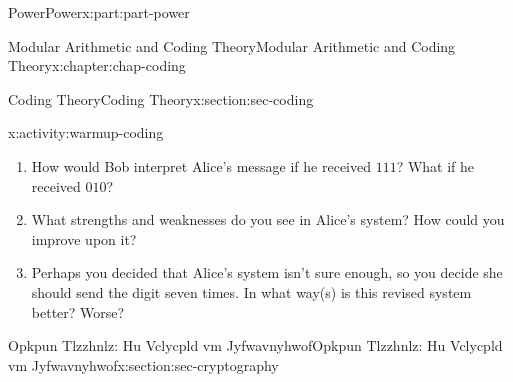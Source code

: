 \documentclass[oneside,10pt,]{book}
\numberwithin{equation}{section}
\begin{document}
\begin{partptx}{Power}{}{Power}{}{}{x:part:part-power}
\begin{chapterptx}{Modular Arithmetic and Coding Theory}{}{Modular Arithmetic and Coding Theory}{}{}{x:chapter:chap-coding}
\begin{sectionptx}{Coding Theory}{}{Coding Theory}{}{}{x:section:sec-coding}
\begin{activity}{}{x:activity:warmup-coding}
%
\begin{enumerate}
\item{}How would Bob interpret Alice's message if he received \(111\)? What if he received \(010\)?%
\item{}What strengths and weaknesses do you see in Alice's system? How could you improve upon it?%
\item{}Perhaps you decided that Alice's system isn't sure enough, so you decide she should send the digit seven times. In what way(s) is this revised system better? Worse?%
\end{enumerate}
\end{activity}%
\end{sectionptx}
%
%
\typeout{************************************************}
\typeout{************************************************}
%
\begin{sectionptx}{Opkpun Tlzzhnlz: Hu Vclycpld vm Jyfwavnyhwof}{}{Opkpun Tlzzhnlz: Hu Vclycpld vm Jyfwavnyhwof}{}{}{x:section:sec-cryptography}
\end{sectionptx}
\end{chapterptx}
\end{partptx}
%
%
\typeout{************************************************}
\typeout{************************************************}
%
\end{document}

